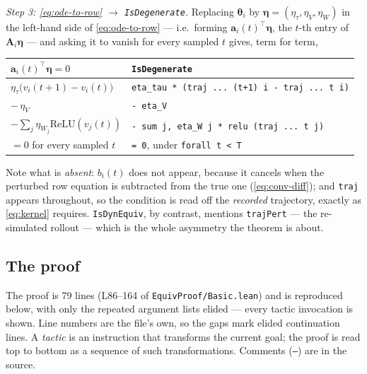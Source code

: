\documentclass[11pt]{article}
\newcommand{\Mat}[1]{\mathbf{#1}}
\newcommand{\A}{\Mat{A}}
\newcommand{\thet}{\boldsymbol{\theta}}
\begin{document}
\emph{Step 3: \eqref{eq:ode-to-row} $\to$ \texttt{IsDegenerate}.} Replacing
$\thet_i$ by $\boldsymbol\eta=(\eta_\tau,\eta_V,\eta_W)$ in the left-hand
side of \eqref{eq:ode-to-row} --- i.e.\ forming $\Mat
a_i(t)^{\!\top}\boldsymbol\eta$, the $t$-th entry of $\A_i\boldsymbol\eta$
--- and asking it to vanish for every sampled $t$ gives, term for term,
\begin{center}
\begin{tabular}{@{}ll@{}}
\toprule
$\Mat a_i(t)^{\!\top}\boldsymbol\eta = 0$ & \texttt{IsDegenerate} \\
\midrule
$\eta_\tau\big(v_i(t{+}1)-v_i(t)\big)$
  & \texttt{eta\_tau * (traj ... (t+1) i - traj ... t i)} \\
$-\,\eta_V$
  & \texttt{- eta\_V} \\
$-\sum_j \eta_{W_j}\mathrm{ReLU}(v_j(t))$
  & \texttt{- sum j, eta\_W j * relu (traj ... t j)} \\
$=0$ for every sampled $t$
  & \texttt{= 0}, under \texttt{forall t < T} \\
\bottomrule
\end{tabular}
\end{center}
Note what is \emph{absent}: $b_i(t)$ does not appear, because it cancels
when the perturbed row equation is subtracted from the true one
(\eqref{eq:conv-diff}); and \texttt{traj} appears throughout, so the
condition is read off the \emph{recorded} trajectory, exactly as
\eqref{eq:kernel} requires. \texttt{IsDynEquiv}, by contrast, mentions
\texttt{trajPert} --- the re-simulated rollout --- which is the whole
asymmetry the theorem is about.

\subsection{The proof}
\label{sec:leanproof}

The proof is 79 lines (L86--164 of \texttt{EquivProof/Basic.lean}) and is
reproduced below, with only the repeated argument lists elided --- every
tactic invocation is shown. Line numbers are the file's own, so the gaps
mark elided continuation lines. A \emph{tactic} is an instruction that
transforms the current goal; the proof is read top to bottom as a sequence
of such transformations. Comments (\texttt{--}) are in the source.
\end{document}
